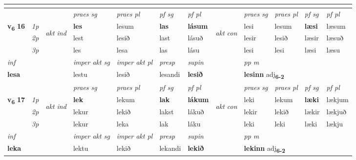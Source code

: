 \begin{longtable}[l]{X>{\footnotesize\itshape}llXXXXlXXXX}
\midrule
  & \\
   \midrule
 & &   & \textit{praes sg}  & \textit{praes pl}    & \textit{ pf sg} & \textit{pf pl} & & \textit{praes sg}  & \textit{praes pl}    & \textit{pf sg} & \textit{pf pl }  \\ \cmidrule{4-7} \cmidrule{9-12}
 \multirow{2}{*}{{{\textbf{v{\textsubscript{6}}} \Large{\textbf{16}}}}}  & 1p & \multirow{3}{*}{\begin{turn}{90}\textit{akt ind}\end{turn}} & \textbf{les} & lesum & \textbf{las} & \textbf{lásum} & \multirow{3}{*}{\begin{turn}{90}\textit{akt con}\end{turn}} &lesi & lesum & \textbf{læsi} & læsum\\*
 & 2p &  &  lest  & lesið & last & lásuð & & lesir & lesið & læsir & læsuð \\*
 & 3p &  & les & lesa & las & lásu & & lesi & lesi& læsi & læsu \\*
\cmidrule{4-7} \cmidrule{9-12}

   {\textit{inf}} & &  & \textit{imper akt sg} & \textit{imper akt pl}   & \textit{presp} & \textit{supin}  && \textit{pp m} \\*
  {\textbf{lesa}} & && lestu  & lesið   & lesandi &  \textbf{lesið}  && \multicolumn{2}{l}{\textbf{lesinn} adj\textbf{\textsubscript{6-2}}} \\*

\midrule

 & &   & \textit{praes sg}  & \textit{praes pl}    & \textit{ pf sg} & \textit{pf pl} & & \textit{praes sg}  & \textit{praes pl}    & \textit{pf sg} & \textit{pf pl }  \\ \cmidrule{4-7} \cmidrule{9-12}
 \multirow{2}{*}{{{\textbf{v{\textsubscript{6}}} \Large{\textbf{17}}}}}  & 1p & \multirow{3}{*}{\begin{turn}{90}\textit{akt ind}\end{turn}} & \textbf{lek} & lekum & \textbf{lak} & \textbf{lákum} & \multirow{3}{*}{\begin{turn}{90}\textit{akt con}\end{turn}} &leki & lekum & \textbf{læki} & lækjum\\*
 & 2p &  &  lekur  & lekið & lakst & lákuð & & lekir & lekið & lækir & lækjuð \\*
 & 3p &  & lekur & leka & lak & láku & & leki & leki& læki & lækju \\*
\cmidrule{4-7} \cmidrule{9-12}

   {\textit{inf}} & &  & \textit{imper akt sg} & \textit{imper akt pl}   & \textit{presp} & \textit{supin}  && \textit{pp m} \\*
  {\textbf{leka}} & && lektu  & lekið   & lekandi &  \textbf{lekið}  && \multicolumn{2}{l}{\textbf{lekinn} adj\textbf{\textsubscript{6-2}}} \\*


\end{longtable}
